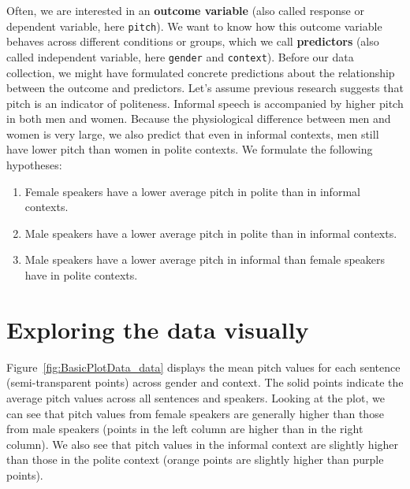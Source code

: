 \documentclass[nobib]{tufte-handout}
\begin{document}
Often, we are interested in an \textbf{outcome variable} (also called response or dependent variable, here \texttt{pitch}). We want to know how this outcome variable behaves
across different conditions or groups, which we call \textbf{predictors} (also called independent variable, here \texttt{gender} and \texttt{context}). Before our data collection,
we might have formulated concrete predictions about the relationship between the outcome and predictors. Let's assume previous research suggests that pitch is an indicator of politeness. Informal speech is accompanied by higher pitch in both men and women. Because the physiological difference between men and women is very large, we also predict that even in informal contexts, men still have lower pitch than women in polite contexts. We formulate the following hypotheses:

\begin{enumerate}[{H}1:]
\item Female speakers have a lower average pitch in polite than in informal contexts.
\item Male speakers have a lower average pitch in polite than in informal contexts.
\item Male speakers have a lower average pitch in informal than female speakers have in polite contexts.
\end{enumerate}

\section{Exploring the data visually}

Figure~\ref{fig:BasicPlotData_data} displays the mean pitch values for each
sentence (semi-transparent points) across gender and context.
%
%
The solid points indicate the average pitch values across all sentences and speakers.
Looking at the plot, we can see that pitch values from female speakers are generally higher
than those from male speakers (points in the left column are higher than in the right column).
We also see that pitch values in the informal context are slightly higher than those in the polite context (orange points are
slightly higher than purple points).
\end{document}
